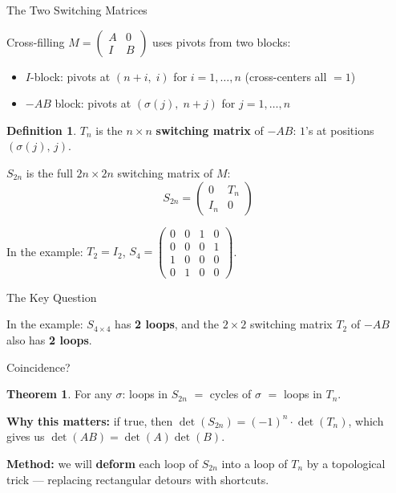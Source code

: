 \documentclass[10pt]{beamer}
\theoremstyle{definition}
\newtheorem{defi}{Definition}[section]
\newtheorem{thm}{Theorem}[section]
\newcommand{\x}[1]{\alert{\textbf{#1}}}
\begin{document}
\begin{frame}{The Two Switching Matrices}

Cross-filling $M = \left(\begin{smallmatrix} A & 0 \\ I & B \end{smallmatrix}\right)$ uses pivots from two blocks:

\vfill

\begin{itemize}
\item $I$-block: pivots at $(n{+}i,\; i)$ for $i = 1, \ldots, n$ \quad (cross-centers all $= 1$)
\item $-AB$ block: pivots at $(\sigma(j),\; n{+}j)$ for $j = 1, \ldots, n$
\end{itemize}

\vfill

\begin{defi}
$T_n$ is the $n \times n$ \x{switching matrix} of $-AB$: \; $1$'s at positions $(\sigma(j),\, j)$.

$S_{2n}$ is the full $2n \times 2n$ switching matrix of $M$:
$$
S_{2n} = \begin{pmatrix} 0 & T_n \\ I_n & 0 \end{pmatrix}
$$
\end{defi}

\vfill

In the example: $T_2 = I_2$, \; $S_4 = \left(\begin{smallmatrix} 0&0&1&0 \\ 0&0&0&1 \\ 1&0&0&0 \\ 0&1&0&0 \end{smallmatrix}\right)$.

\end{frame}


\begin{frame}{The Key Question}

In the example: $S_{4\times 4}$ has \x{2 loops}, and the $2 \times 2$ switching matrix $T_2$ of $-AB$ also has \x{2 loops}.

\vfill

Coincidence?

\vfill

\begin{thm}
For any $\sigma$: \quad loops in $S_{2n}$ $=$ cycles of $\sigma$ $=$ loops in $T_n$.
\end{thm}

\vfill

\textbf{Why this matters:} if true, then $\det(S_{2n}) = (-1)^n \cdot \det(T_n)$, which gives us $\det(AB) = \det(A)\det(B)$.

\vfill

\textbf{Method:} we will \x{deform} each loop of $S_{2n}$ into a loop of $T_n$ by a topological trick --- replacing rectangular detours with shortcuts.

\end{frame}
\end{document}
